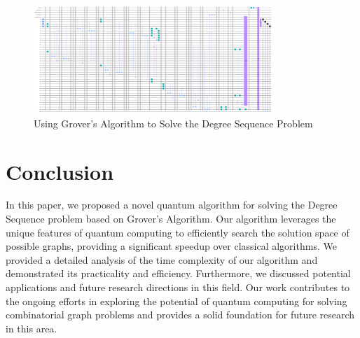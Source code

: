 \begin{figure}[htp]
    \centering
    \includegraphics[width=9cm]{Figures/Degree_Sequence_circuit.png}
    \caption{Using Grover's Algorithm to Solve the Degree Sequence Problem}
    \label{fig:Degree_Sequence}
\end{figure}

\section{Conclusion}
\label{sec:conclusion}

In this paper, we proposed a novel quantum algorithm for solving the Degree Sequence problem based on Grover's Algorithm. Our algorithm leverages the unique features of quantum computing to efficiently search the solution space of possible graphs, providing a significant speedup over classical algorithms. We provided a detailed analysis of the time complexity of our algorithm and demonstrated its practicality and efficiency. Furthermore, we discussed potential applications and future research directions in this field. Our work contributes to the ongoing efforts in exploring the potential of quantum computing for solving combinatorial graph problems and provides a solid foundation for future research in this area.

